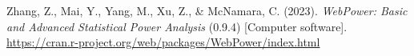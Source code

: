 \documentclass[authordate, meta, issue]{jote-new-article}
\begin{document}
	Zhang, Z., Mai, Y., Yang, M., Xu, Z., \& McNamara, C. (2023). \emph{WebPower: Basic and Advanced Statistical Power Analysis} (0.9.4) [Computer software]. \url{https://cran.r-project.org/web/packages/WebPower/index.html}



    







	

    \clearpage



	






    \clearpage



	





    \clearpage











	









    \clearpage








	
\end{document}
